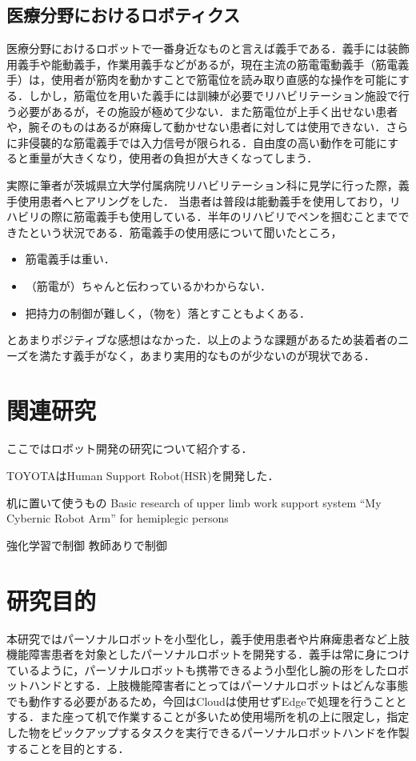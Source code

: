\subsection{医療分野におけるロボティクス}
医療分野におけるロボットで一番身近なものと言えば義手である．義手には装飾用義手や能動義手，作業用義手などがあるが，現在主流の筋電電動義手（筋電義手）は，使用者が筋肉を動かすことで筋電位を読み取り直感的な操作を可能にする．しかし，筋電位を用いた義手には訓練が必要でリハビリテーション施設で行う必要があるが，その施設が極めて少ない\cite{リハビリテーション}．また筋電位が上手く出せない患者や，腕そのものはあるが麻痺して動かせない患者に対しては使用できない．さらに非侵襲的な筋電義手では入力信号が限られる．自由度の高い動作を可能にすると重量が大きくなり，使用者の負担が大きくなってしまう．

実際に筆者が茨城県立大学付属病院リハビリテーション科に見学に行った際，義手使用患者へヒアリングをした．
当患者は普段は能動義手を使用しており，リハビリの際に筋電義手も使用している．半年のリハビリでペンを掴むことまでできたという状況である．筋電義手の使用感について聞いたところ，
\begin{itemize}
    \item 筋電義手は重い．
    \item （筋電が）ちゃんと伝わっているかわからない．
    \item 把持力の制御が難しく，（物を）落とすこともよくある．
\end{itemize}
とあまりポジティブな感想はなかった．以上のような課題があるため装着者のニーズを満たす義手がなく，あまり実用的なものが少ないのが現状である．


\section{関連研究}
ここではロボット開発の研究について紹介する．

TOYOTAはHuman Support Robot(HSR)を開発した\cite{HSR}．



机に置いて使うもの
Basic research of upper limb work support system “My Cybernic Robot Arm” for hemiplegic persons\cite{Sankai2018}





強化学習で制御
教師ありで制御


\section{研究目的}

本研究ではパーソナルロボットを小型化し，義手使用患者や片麻痺患者など上肢機能障害患者を対象としたパーソナルロボットを開発する．義手は常に身につけているように，パーソナルロボットも携帯できるよう小型化し腕の形をしたロボットハンドとする．上肢機能障害者にとってはパーソナルロボットはどんな事態でも動作する必要があるため，今回はCloudは使用せずEdgeで処理を行うこととする．また座って机で作業することが多いため使用場所を机の上に限定し，指定した物をピックアップするタスクを実行できるパーソナルロボットハンドを作製することを目的とする．
